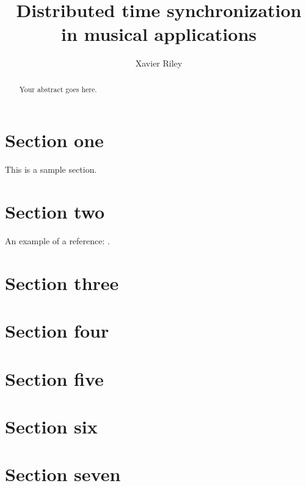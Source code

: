 \documentclass[11pt]{article} %
\title{Distributed time synchronization in musical applications}
\author{Xavier Riley}
\theoremstyle{plain}
\theoremstyle{definition}
\begin{document}
\maketitle

\declaration




\begin{abstract}
  Your abstract goes here.
\end{abstract}

\section{Section one}

This is a sample section.

\section{Section two}

An example of a reference:
\cite{hastie/etal:2009}.

\section{Section three}
\section{Section four}
\section{Section five}
\section{Section six}
\section{Section seven}



\end{document}
